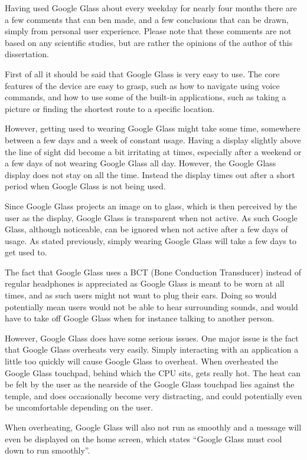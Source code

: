 Having used Google Glass about every weekday for nearly four months there are a few comments that can ben made, and a few conclusions that can be drawn, simply from personal user experience. Please note that these comments are not based on any scientific studies, but are rather the opinions of the author of this dissertation.

First of all it should be said that Google Glass is very easy to use. The core features of the device are easy to grasp, such as how to navigate using voice commands, and how to use some of the built-in applications, such as taking a picture or finding the shortest route to a specific location.

However, getting used to wearing Google Glass might take some time, somewhere between a few days and a week of constant usage. Having a display slightly above the line of sight did become a bit irritating at times, especially after a weekend or a few days of not wearing Google Glass all day. However, the Google Glass display does not stay on all the time. Instead the display times out after a short period when Google Glass is not being used.

Since Google Glass projects an image on to glass, which is then perceived by the user as the display, Google Glass is transparent when not active. As such Google Glass, although noticeable, can be ignored when not active after a few days of usage. As stated previously, simply wearing Google Glass will take a few days to get used to.

The fact that Google Glass uses a BCT (Bone Conduction Transducer) instead of regular headphones is appreciated as Google Glass is meant to be worn at all times, and as such users might not want to plug their ears. Doing so would potentially mean users would not be able to hear surrounding sounds, and would have to take off Google Glass when for instance talking to another person.

However, Google Glass does have some serious issues. One major issue is the fact that Google Glass overheats very easily. Simply interacting with an application a little too quickly will cause Google Glass to overheat. When overheated the Google Glass touchpad, behind which the CPU sits, gets really hot. The heat can be felt by the user as the nearside of the Google Glass touchpad lies against the temple, and does occasionally become very distracting, and could potentially even be uncomfortable depending on the user.

When overheating, Google Glass will also not run as smoothly and a message will even be displayed on the home screen, which states ``Google Glass must cool down to run smoothly''.

